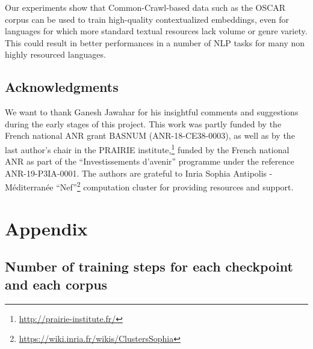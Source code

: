 Our experiments show that Common-Crawl-based data such as the OSCAR corpus can be used to train high-quality contextualized embeddings, even for languages for which more standard textual resources lack volume or genre variety. This could result in better performances in a number of NLP tasks for many non highly resourced languages.

\subsection*{Acknowledgments}

We want to thank Ganesh Jawahar for his insightful comments and suggestions during the early stages of this project. This work was partly funded by the French national ANR grant BASNUM (\mbox{ANR-18-CE38-0003}), as well as by the last author's chair in the PRAIRIE institute,\footnote{\url{http://prairie-institute.fr/}} funded by the French national ANR as part of the ``Investissements d’avenir'' programme under the reference \mbox{ANR-19-P3IA-0001}. The authors are grateful to Inria Sophia Antipolis - Méditerranée ``Nef''\footnote{\url{https://wiki.inria.fr/wikis/ClustersSophia}} computation cluster for providing resources and support.

\section{Appendix}
\label{sec:appendix}
\subsection{Number of training steps for each checkpoint and each corpus}

